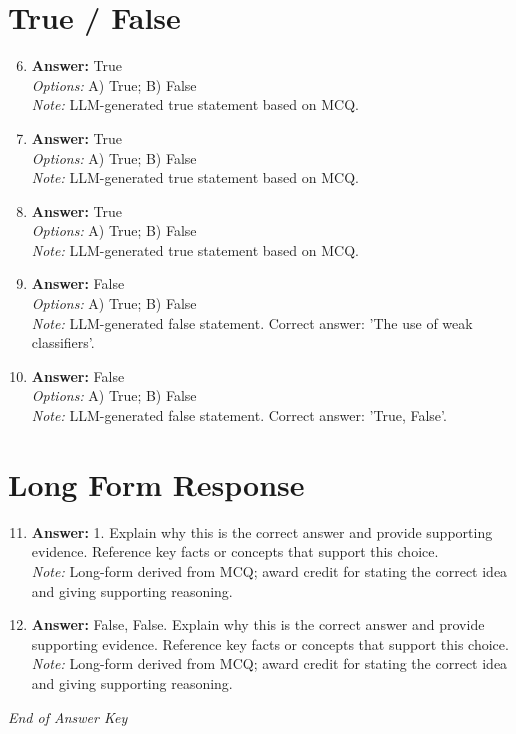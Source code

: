 \documentclass[12pt]{article}
\begin{document}
\section*{True / False}
\begin{enumerate}[label=\arabic*.]
\setcounter{enumi}{5}
\item \textbf{Answer:} True
\\ \textit{Options:} A) True; B) False
\\ \textit{Note:} LLM-generated true statement based on MCQ.
\item \textbf{Answer:} True
\\ \textit{Options:} A) True; B) False
\\ \textit{Note:} LLM-generated true statement based on MCQ.
\item \textbf{Answer:} True
\\ \textit{Options:} A) True; B) False
\\ \textit{Note:} LLM-generated true statement based on MCQ.
\item \textbf{Answer:} False
\\ \textit{Options:} A) True; B) False
\\ \textit{Note:} LLM-generated false statement. Correct answer: 'The use of weak classifiers'.
\item \textbf{Answer:} False
\\ \textit{Options:} A) True; B) False
\\ \textit{Note:} LLM-generated false statement. Correct answer: 'True, False'.
\end{enumerate}

\section*{Long Form Response}
\begin{enumerate}[label=\arabic*.]
\setcounter{enumi}{10}
\item \textbf{Answer:} 1. Explain why this is the correct answer and provide supporting evidence. Reference key facts or concepts that support this choice.
\\ \textit{Note:} Long-form derived from MCQ; award credit for stating the correct idea and giving supporting reasoning.
\item \textbf{Answer:} False, False. Explain why this is the correct answer and provide supporting evidence. Reference key facts or concepts that support this choice.
\\ \textit{Note:} Long-form derived from MCQ; award credit for stating the correct idea and giving supporting reasoning.
\end{enumerate}

\vfill
\noindent\textit{End of Answer Key}
\end{document}
